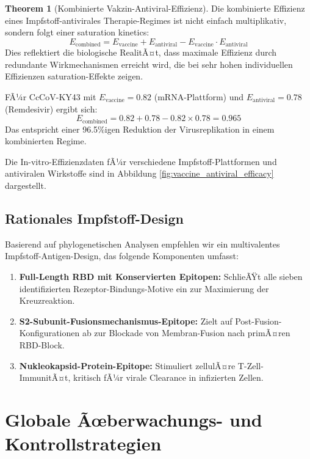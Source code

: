 ﻿\documentclass[11pt,a4paper]{article}
\theoremstyle{definition}
\newtheorem{theorem}{Theorem}[section]
\begin{document}
\begin{theorem}[Kombinierte Vakzin-Antiviral-Effizienz]
Die kombinierte Effizienz eines Impfstoff-antivirales Therapie-Regimes ist nicht einfach multiplikativ, sondern folgt einer saturation kinetics:
\[
E_{\text{combined}} = E_{\text{vaccine}} + E_{\text{antiviral}} - E_{\text{vaccine}} \cdot E_{\text{antiviral}}
\]
Dies reflektiert die biologische RealitÃ¤t, dass maximale Effizienz durch redundante Wirkmechanismen erreicht wird, die bei sehr hohen individuellen Effizienzen saturation-Effekte zeigen.

FÃ¼r CcCoV-KY43 mit $E_{\text{vaccine}} = 0.82$ (mRNA-Plattform) und $E_{\text{antiviral}} = 0.78$ (Remdesivir) ergibt sich:
\[
E_{\text{combined}} = 0.82 + 0.78 - 0.82 \times 0.78 = 0.965
\]
Das entspricht einer 96.5\%igen Reduktion der Virusreplikation in einem kombinierten Regime.
\end{theorem}

Die In-vitro-Effizienzdaten fÃ¼r verschiedene Impfstoff-Plattformen und antiviralen Wirkstoffe sind in Abbildung \ref{fig:vaccine_antiviral_efficacy} dargestellt.

\subsection{Rationales Impfstoff-Design}

Basierend auf phylogenetischen Analysen empfehlen wir ein multivalentes Impfstoff-Antigen-Design, das folgende Komponenten umfasst:

\begin{enumerate}
\item \textbf{Full-Length RBD mit Konservierten Epitopen:} SchlieÃŸt alle sieben identifizierten Rezeptor-Bindungs-Motive ein zur Maximierung der Kreuzreaktion.

\item \textbf{S2-Subunit-Fusionsmechanismus-Epitope:} Zielt auf Post-Fusion-Konfigurationen ab zur Blockade von Membran-Fusion nach primÃ¤ren RBD-Block.

\item \textbf{Nukleokapsid-Protein-Epitope:} Stimuliert zellulÃ¤re T-Zell-ImmunitÃ¤t, kritisch fÃ¼r virale Clearance in infizierten Zellen.
\end{enumerate}

\section{Globale Ãœberwachungs- und Kontrollstrategien}
\end{document}
